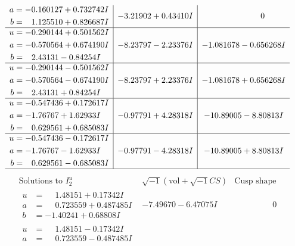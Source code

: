 \documentclass[1p]{elsarticle_modified}
\theoremstyle{definition}
\newcommand{\I}{\sqrt{-1}}
\begin{document}
$$\begin{array}{c|c|c}
\begin{aligned}
a &= -0.160127 + 0.732742 I \\
b &= \phantom{-}1.125510 + 0.826687 I\end{aligned}
 & -3.21902 + 0.43410 I & \phantom{-0.000000 } 0 \\ \hline\begin{aligned}
u &= -0.290144 + 0.501562 I \\
a &= -0.570564 + 0.674190 I \\
b &= \phantom{-}2.43131 - 0.84254 I\end{aligned}
 & -8.23797 - 2.23376 I & -1.081678 - 0.656268 I \\ \hline\begin{aligned}
u &= -0.290144 - 0.501562 I \\
a &= -0.570564 - 0.674190 I \\
b &= \phantom{-}2.43131 + 0.84254 I\end{aligned}
 & -8.23797 + 2.23376 I & -1.081678 + 0.656268 I \\ \hline\begin{aligned}
u &= -0.547436 + 0.172617 I \\
a &= -1.76767 + 1.62933 I \\
b &= \phantom{-}0.629561 + 0.685083 I\end{aligned}
 & -0.97791 + 4.28318 I & -10.89005 - 8.80813 I \\ \hline\begin{aligned}
u &= -0.547436 - 0.172617 I \\
a &= -1.76767 - 1.62933 I \\
b &= \phantom{-}0.629561 - 0.685083 I\end{aligned}
 & -0.97791 - 4.28318 I & -10.89005 + 8.80813 I\\
 \hline 
 \end{array}$$\newpage$$\begin{array}{c|c|c}  
\text{Solutions to }I^u_{2}& \I (\text{vol} + \sqrt{-1}CS) & \text{Cusp shape}\\
 \hline 
\begin{aligned}
u &= \phantom{-}1.48151 + 0.17342 I \\
a &= \phantom{-}0.723559 + 0.487485 I \\
b &= -1.40241 + 0.68808 I\end{aligned}
 & -7.49670 - 6.47075 I & \phantom{-0.000000 } 0 \\ \hline\begin{aligned}
u &= \phantom{-}1.48151 - 0.17342 I \\
a &= \phantom{-}0.723559 - 0.487485 I \\

\end{aligned}
\end{array}$$
\end{document}

